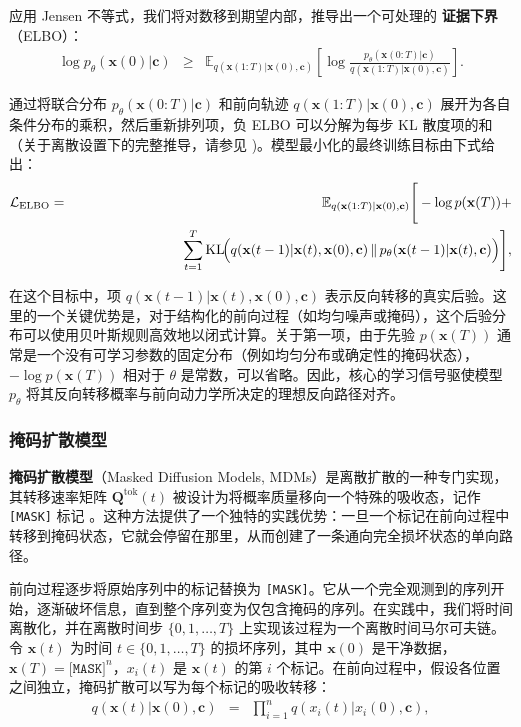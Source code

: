 \documentclass[UTF8,a4paper,zihao=-4,oneside,openany]{ctexbook}
\begin{document}
\noindent 应用 Jensen 不等式，我们将对数移到期望内部，推导出一个可处理的 \textbf{证据下界}（ELBO）：
\begin{eqnarray}
\log p_\theta(\mathbf{x}(0) | \mathbf{c}) & \ge & \mathbb{E}_{q(\mathbf{x}(1{:}T) | \mathbf{x}(0), \mathbf{c})} \left[ \log \frac{p_\theta(\mathbf{x}(0{:}T) | \mathbf{c})}{q(\mathbf{x}(1{:}T) | \mathbf{x}(0), \mathbf{c})} \right].
\end{eqnarray}

通过将联合分布 $p_\theta(\mathbf{x}(0{:}T) | \mathbf{c})$ 和前向轨迹 $q(\mathbf{x}(1{:}T) | \mathbf{x}(0), \mathbf{c})$ 展开为各自条件分布的乘积，然后重新排列项，负 ELBO 可以分解为每步 KL 散度项的和（关于离散设置下的完整推导，请参见 \citep{austin-etal:2021structured})。模型最小化的最终训练目标由下式给出：
\begin{eqnarray}
\mathcal{L}_{\mathrm{ELBO}} & = & \mathbb{E}_{q(\mathbf{x}(1{:}T)| \mathbf{x}(0),\mathbf{c})}
\Bigg[
-\log p(\mathbf{x}(T))
+ \nonumber \\
& & \hspace{2.7cm} \sum_{t=1}^{T}
\mathrm{KL}\!\Big(
q(\mathbf{x}(t-1)| \mathbf{x}(t),\mathbf{x}(0),\mathbf{c})
\,\Vert\,
p_\theta(\mathbf{x}(t-1)| \mathbf{x}(t),\mathbf{c})
\Big)
\Bigg],
\label{eq:discrete-elbo}
\end{eqnarray}

\noindent 在这个目标中，项 $q(\mathbf{x}(t-1)| \mathbf{x}(t),\mathbf{x}(0),\mathbf{c})$ 表示反向转移的真实后验。这里的一个关键优势是，对于结构化的前向过程（如均匀噪声或掩码），这个后验分布可以使用贝叶斯规则高效地以闭式计算。关于第一项，由于先验 $p(\mathbf{x}(T))$ 通常是一个没有可学习参数的固定分布（例如均匀分布或确定性的掩码状态），$-\log p(\mathbf{x}(T))$ 相对于 $\theta$ 是常数，可以省略。因此，核心的学习信号驱使模型 $p_\theta$ 将其反向转移概率与前向动力学所决定的理想反向路径对齐。
\subsubsection{掩码扩散模型}

\textbf{掩码扩散模型}（Masked Diffusion Models, MDMs）是离散扩散的一种专门实现，其转移速率矩阵 $\mathbf{Q}^{\mathrm{tok}}(t)$ 被设计为将概率质量移向一个特殊的吸收态，记作 \texttt{[MASK]} 标记 \citep{sahoo-etal:2024simple,nie-etal:2025large}。这种方法提供了一个独特的实践优势：一旦一个标记在前向过程中转移到掩码状态，它就会停留在那里，从而创建了一条通向完全损坏状态的单向路径。

前向过程逐步将原始序列中的标记替换为 \texttt{[MASK]}。它从一个完全观测到的序列开始，逐渐破坏信息，直到整个序列变为仅包含掩码的序列。在实践中，我们将时间离散化，并在离散时间步 $\{0,1,\dots,T\}$ 上实现该过程为一个离散时间马尔可夫链。令 $\mathbf{x}(t)$ 为时间 $t \in \{0,1,\dots,T\}$ 的损坏序列，其中 $\mathbf{x}(0)$ 是干净数据，$\mathbf{x}(T) = \texttt{[MASK]}^n$，$x_i(t)$ 是 $\mathbf{x}(t)$ 的第 $i$ 个标记。在前向过程中，假设各位置之间独立，掩码扩散可以写为每个标记的吸收转移：
\begin{eqnarray}
q(\mathbf{x}(t) | \mathbf{x}(0), \mathbf{c}) & = & \prod_{i=1}^n q(x_i(t) | x_i(0), \mathbf{c}), \label{eq:mdm-forward-factorize}
\end{eqnarray}
\end{document}
